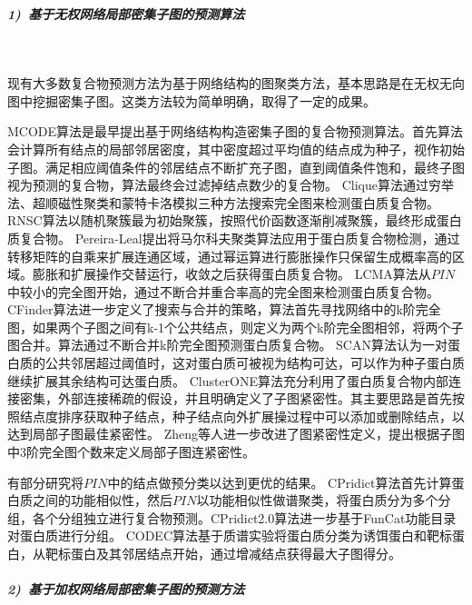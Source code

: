 \subparagraph*{1)~基于无权网络局部密集子图的预测算法} ~

现有大多数复合物预测方法为基于网络结构的图聚类方法，基本思路是在无权无向图中挖掘密集子图。这类方法较为简单明确，取得了一定的成果。

MCODE算法\cite{bader_automated_2003}是最早提出基于网络结构构造密集子图的复合物预测算法。首先算法会计算所有结点的局部邻居密度，其中密度超过平均值的结点成为种子，视作初始子图。满足相应阈值条件的邻居结点不断扩充子图，直到阈值条件饱和，最终子图视为预测的复合物，算法最终会过滤掉结点数少的复合物。
Clique算法\cite{spirin_protein_2003}通过穷举法、超顺磁性聚类和蒙特卡洛模拟三种方法搜索完全图来检测蛋白质复合物。
RNSC算法\cite{king_protein_2004}以随机聚簇最为初始聚簇，按照代价函数逐渐削减聚簇，最终形成蛋白质复合物。
Pereira‐Leal\cite{pereiraleal_detection_2004}提出将马尔科夫聚类算法应用于蛋白质复合物检测，通过转移矩阵的自乘来扩展连通区域，通过幂运算进行膨胀操作只保留生成概率高的区域。膨胀和扩展操作交替运行，收敛之后获得蛋白质复合物。
LCMA算法\cite{li_interaction_2005}从$PIN$中较小的完全图开始，通过不断合并重合率高的完全图来检测蛋白质复合物。CFinder算法\cite{adamcsek_cfinder_2006}进一步定义了搜索与合并的策略，算法首先寻找网络中的k阶完全图，如果两个子图之间有k-1个公共结点，则定义为两个k阶完全图相邻，将两个子图合并。算法通过不断合并k阶完全图预测蛋白质复合物。
SCAN算法\cite{mete_structural_2008}认为一对蛋白质的公共邻居超过阈值时，这对蛋白质可被视为结构可达，可以作为种子蛋白质继续扩展其余结构可达蛋白质。
ClusterONE算法\cite{nepusz_detecting_2012}充分利用了蛋白质复合物内部连接密集，外部连接稀疏的假设，并且明确定义了子图紧密性。其主要思路是首先按照结点度排序获取种子结点，种子结点向外扩展操过程中可以添加或删除结点，以达到局部子图最佳紧密性。
Zheng等人\cite{zheng_protein_2020}进一步改进了图紧密性定义，提出根据子图中3阶完全图个数来定义局部子图连紧密性。

有部分研究将$PIN$中的结点做预分类以达到更优的结果。
CPridict算法\cite{xu_function_2014}首先计算蛋白质之间的功能相似性，然后$PIN$以功能相似性做谱聚类，将蛋白质分为多个分组，各个分组独立进行复合物预测。CPridict2.0算法\cite{xu_effective_2017}进一步基于FunCat功能目录对蛋白质进行分组。
CODEC算法\cite{geva_identification_2011}基于质谱实验将蛋白质分类为诱饵蛋白和靶标蛋白，从靶标蛋白及其邻居结点开始，通过增减结点获得最大子图得分。

\subparagraph*{2)~基于加权网络局部密集子图的预测方法} ~

